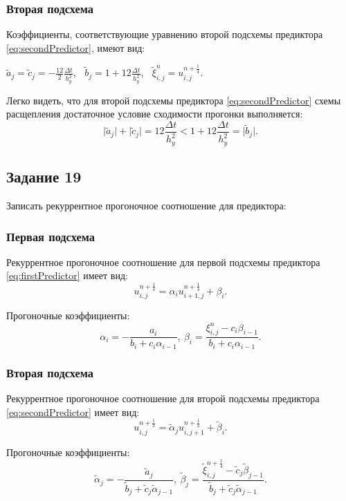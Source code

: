 \documentclass[12pt, a4paper]{report}
\begin{document}
	\subsubsection*{Вторая подсхема}
	\large
	Коэффициенты, соответствующие уравнению второй подсхемы предиктора \eqref{eq:secondPredictor}, имеют вид:
	\small
	\begin{center}
		$\tilde{a}_{j}=\tilde{c}_{j}=-\frac{12}{2}\frac{\Delta t}{h_{y}^{2}}$, $\>$ $\tilde{b}_{j}=1 + 12\frac{\Delta t}{h_{y}^{2}}$, $\>$ $\tilde{\xi}_{i, j}^{n}=u_{i, j}^{n+\frac{1}{4}}$.
	\end{center}
	\par
	\large
	Легко видеть, что для второй подсхемы предиктора \eqref{eq:secondPredictor} схемы расщепления достаточное условие сходимости прогонки выполняется:
	\begin{equation*}
		\lvert \tilde{a}_{j} \rvert + \lvert \tilde{c}_{j} \rvert = 12\frac{\Delta t}{h_{y}^{2}} < 1 + 12\frac{\Delta t}{h_{y}^{2}} = \lvert \tilde{b}_{j} \rvert.
	\end{equation*}

	\subsection*{Задание 19}
	\large
	Записать рекуррентное прогоночное соотношение для предиктора:
	\subsubsection*{Первая подсхема}
	\large
	Рекуррентное прогоночное соотношение для первой подсхемы предиктора \eqref{eq:firstPredictor} имеет вид:
	\begin{equation*}
		u_{i, j}^{n+\frac{1}{4}} = \alpha_{i}u_{i+1, j}^{n+\frac{1}{4}} + \beta_{i}.
	\end{equation*}
	\par
	Прогоночные коэффициенты:
	\begin{equation*}
		\alpha_{i} = -\frac{a_{i}}{b_{i} + c_{i}\alpha_{i-1}}, \> \beta_{i} = \frac{\xi_{i, j}^{n} - c_{i}\beta_{i-1}}{b_{i} + c_{i}\alpha_{i-1}}.
	\end{equation*}
	\subsubsection*{Вторая подсхема}
	\large
	Рекуррентное прогоночное соотношение для второй подсхемы предиктора \eqref{eq:secondPredictor} имеет вид:
	\begin{equation*}
		u_{i, j}^{n+\frac{1}{2}} = \tilde{\alpha}_{j}u_{i, j+1}^{n+\frac{1}{2}} + \tilde{\beta}_{i}.
	\end{equation*}
	\par
	Прогоночные коэффициенты:
	\begin{equation*}
		\tilde{\alpha}_{j} = -\frac{\tilde{a}_{j}}{\tilde{b}_{j} + \tilde{c}_{j}\tilde{\alpha}_{j-1}}, \> \tilde{\beta}_{j} = \frac{\tilde{\xi}_{i, j}^{n+\frac{1}{4}} - \tilde{c}_{j}\tilde{\beta}_{j-1}}{\tilde{b}_{j} + \tilde{c}_{j}\tilde{\alpha}_{j-1}}.
	\end{equation*}
\end{document}
